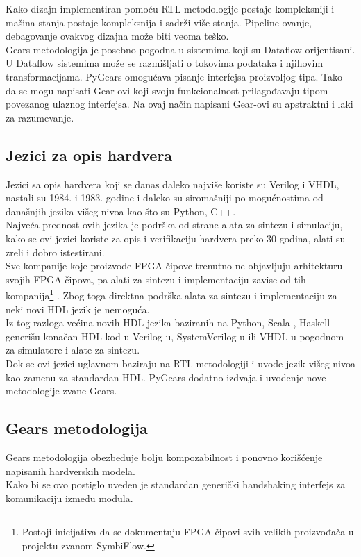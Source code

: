 Kako dizajn implementiran pomoću RTL metodologije postaje kompleksniji i mašina
stanja postaje kompleksnija i sadrži više stanja.
Pipeline-ovanje, debagovanje  ovakvog dizajna može biti veoma teško. \\
Gears metodologija je posebno pogodna u sistemima koji su Dataflow orijentisani.
U Dataflow sistemima može se razmišljati o tokovima podataka i njihovim
transformacijama.
PyGears omogućava pisanje interfejsa proizvoljog tipa.
Tako da se mogu napisati Gear-ovi koji svoju funkcionalnost prilagođavaju
tipom povezanog ulaznog interfejsa.
Na ovaj način napisani Gear-ovi su apstraktni i laki za razumevanje.

\subsection{Jezici za opis hardvera}

Jezici sa opis hardvera koji se danas daleko najviše koriste su Verilog i VHDL,
nastali su 1984. i 1983. godine i daleko su siromašniji po mogućnostima od današnjih
jezika višeg nivoa kao što su Python, C++. \\
Najveća prednost ovih jezika je podrška od strane alata za sintezu i simulaciju,
kako se ovi jezici koriste za opis i verifikaciju hardvera preko 30 godina,
alati su zreli i dobro istestirani. \\

Sve kompanije koje proizvode FPGA čipove trenutno ne objavljuju
arhitekturu svojih FPGA čipova, pa alati za sintezu i implementaciju zavise od
tih kompanija\footnote{Postoji inicijativa da se dokumentuju FPGA čipovi svih velikih
proizvođača u projektu zvanom SymbiFlow\cite{SymbiFlow}.}
.
Zbog toga direktna podrška alata za sintezu i implementaciju za neki novi HDL jezik je
nemoguća. \\

Iz tog razloga većina novih HDL jezika baziranih na
Python\cite{decaluwe2004myhdl, PyGears_OSDA}, Scala
\cite{bachrach2012chisel, SpinalHDL}, Haskell\cite{baaij2010c} generišu konačan
HDL kod u Verilog-u, SystemVerilog-u ili VHDL-u pogodnom za simulatore i alate
za sintezu. \\

Dok se ovi jezici uglavnom baziraju na RTL metodologiji i uvode jezik višeg
nivoa kao zamenu za standardan HDL.
PyGears dodatno izdvaja i uvođenje nove metodologije zvane Gears.

\subsection{Gears metodologija}
Gears metodologija obezbeđuje bolju kompozabilnost i ponovno korišćenje
napisanih hardverskih modela. \\
Kako bi se ovo postiglo uveden je standardan generički handshaking interfejs za
komunikaciju između modula.

